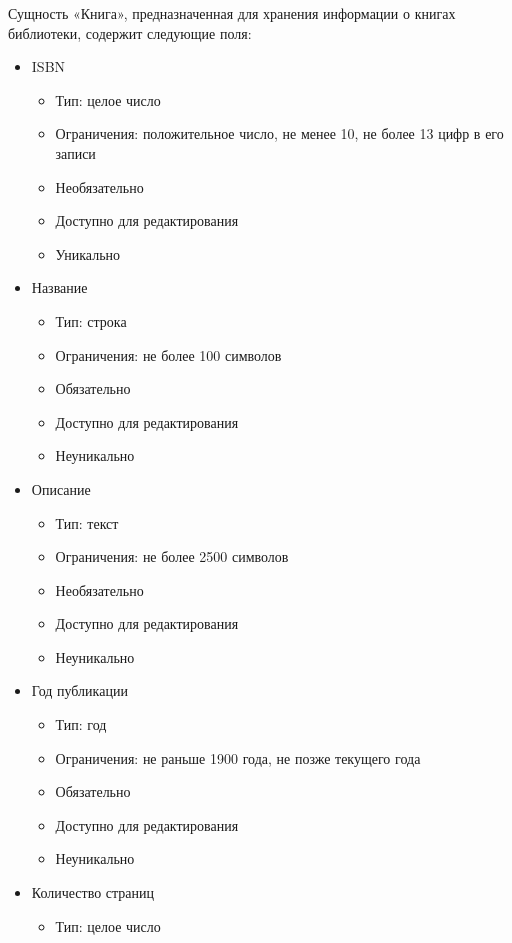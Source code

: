\documentclass[data-specification.tex]{subfiles}
\begin{document}
\par
Сущность «Книга», предназначенная для хранения информации о книгах библиотеки, содержит следующие поля:
\begin{itemize}
    \item ISBN
    \begin{itemize}
        \item Тип: целое число
        \item Ограничения: положительное число, не менее 10, не более 13 цифр в его записи
        \item Необязательно
        \item Доступно для редактирования
        \item Уникально
    \end{itemize}
    \item Название
    \begin{itemize}
        \item Тип: строка
        \item Ограничения: не более 100 символов
        \item Обязательно
        \item Доступно для редактирования
        \item Неуникально
    \end{itemize}
    \item Описание
    \begin{itemize}
        \item Тип: текст
        \item Ограничения: не более 2500 символов
        \item Необязательно
        \item Доступно для редактирования
        \item Неуникально
    \end{itemize}
    \item Год публикации
    \begin{itemize}
        \item Тип: год
        \item Ограничения: не раньше 1900 года, не позже текущего года
        \item Обязательно
        \item Доступно для редактирования
        \item Неуникально
    \end{itemize}
    \item Количество страниц
    \begin{itemize}
        \item Тип: целое число

\end{itemize}
\end{itemize}
\end{document}

